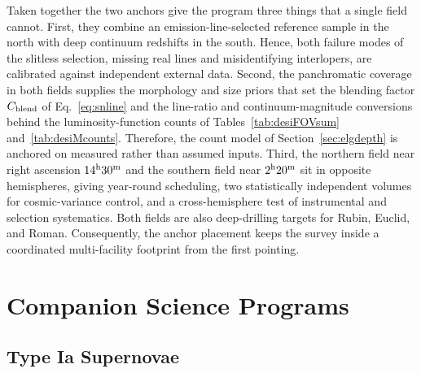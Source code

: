 \documentclass[10pt,onecolumn]{article}
\begin{document}
Taken together the two anchors give the program three things that a single field cannot. First, they combine an emission-line-selected reference sample in the north with deep continuum redshifts in the south. Hence, both failure modes of the slitless selection, missing real lines and misidentifying interlopers, are calibrated against independent external data. Second, the panchromatic coverage in both fields supplies the morphology and size priors that set the blending factor $C_{\rm blend}$ of Eq.~\eqref{eq:snline} and the line-ratio and continuum-magnitude conversions behind the luminosity-function counts of Tables~\ref{tab:desiFOVsum} and~\ref{tab:desiMcounts}. Therefore, the count model of Section~\ref{sec:elgdepth} is anchored on measured rather than assumed inputs. Third, the northern field near right ascension $14^{\rm h}30^{\rm m}$ and the southern field near $2^{\rm h}20^{\rm m}$ sit in opposite hemispheres, giving year-round scheduling, two statistically independent volumes for cosmic-variance control, and a cross-hemisphere test of instrumental and selection systematics. Both fields are also deep-drilling targets for Rubin, Euclid, and Roman. Consequently, the anchor placement keeps the survey inside a coordinated multi-facility footprint from the first pointing.

\clearpage
\section{Companion Science Programs}

\subsection{Type Ia Supernovae}\label{sec:snia}
\end{document}
